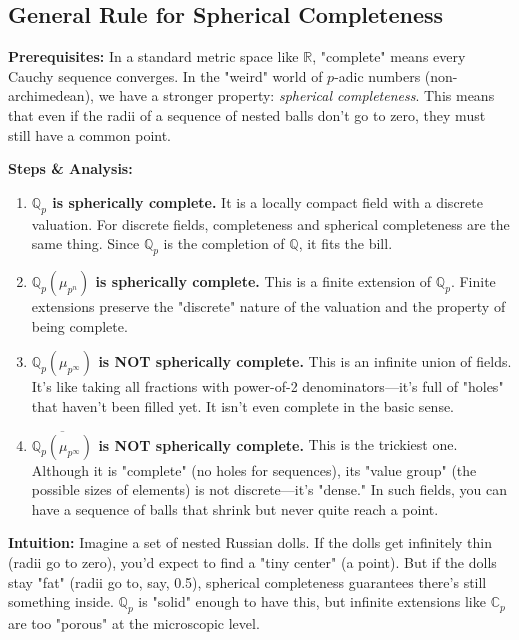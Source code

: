 \begin{solution}
\subsection*{General Rule for Spherical Completeness}

\textbf{Prerequisites:} 
In a standard metric space like $\mathbb{R}$, "complete" means every Cauchy sequence converges. In the "weird" world of $p$-adic numbers (non-archimedean), we have a stronger property: \textit{spherical completeness}. This means that even if the radii of a sequence of nested balls don't go to zero, they must still have a common point.

\textbf{Steps \& Analysis:}
\begin{enumerate}
    \item \textbf{$\mathbb{Q}_p$ is spherically complete.} It is a locally compact field with a discrete valuation. For discrete fields, completeness and spherical completeness are the same thing. Since $\mathbb{Q}_p$ is the completion of $\mathbb{Q}$, it fits the bill.
    
    \item \textbf{$\mathbb{Q}_p(\mu_{p^n})$ is spherically complete.} This is a finite extension of $\mathbb{Q}_p$. Finite extensions preserve the "discrete" nature of the valuation and the property of being complete.
    
    \item \textbf{$\mathbb{Q}_p(\mu_{p^\infty})$ is NOT spherically complete.} This is an infinite union of fields. It's like taking all fractions with power-of-2 denominators—it's full of "holes" that haven't been filled yet. It isn't even complete in the basic sense.
    
    \item \textbf{$\overline{\mathbb{Q}_p(\mu_{p^\infty})}$ is NOT spherically complete.} This is the trickiest one. Although it is "complete" (no holes for sequences), its "value group" (the possible sizes of elements) is not discrete—it's "dense." In such fields, you can have a sequence of balls that shrink but never quite reach a point.
\end{enumerate}

\textbf{Intuition:}
Imagine a set of nested Russian dolls. If the dolls get infinitely thin (radii go to zero), you'd expect to find a "tiny center" (a point). But if the dolls stay "fat" (radii go to, say, 0.5), spherical completeness guarantees there's still something inside. $\mathbb{Q}_p$ is "solid" enough to have this, but infinite extensions like $\mathbb{C}_p$ are too "porous" at the microscopic level.
\end{solution}
